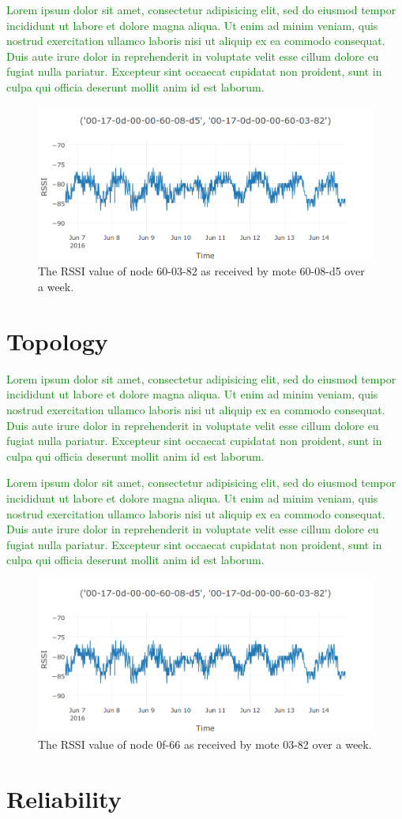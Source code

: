 \documentclass{sig-alternate}
\newcommand{\lorem}               {\textcolor{green}{Lorem ipsum dolor sit amet, consectetur adipisicing elit, sed do eiusmod tempor incididunt ut labore et dolore magna aliqua. Ut enim ad minim veniam, quis nostrud exercitation ullamco laboris nisi ut aliquip ex ea commodo consequat. Duis aute irure dolor in reprehenderit in voluptate velit esse cillum dolore eu fugiat nulla pariatur. Excepteur sint occaecat cupidatat non proident, sunt in culpa qui officia deserunt mollit anim id est laborum.}}
\begin{document}
\lorem


\begin{figure}
    \centering
    \includegraphics[width=\columnwidth]{periodic_rssi}
    \caption{The RSSI value of node 60-03-82 as received by mote 60-08-d5 over a week.}
    \label{fig:periodic_rssi}
\end{figure}


\section{Topology}
\label{sec:topology}


\lorem


\lorem

\begin{figure}
    \centering
    \includegraphics[width=\columnwidth]{periodic_rssi}
    \caption{The RSSI value of node 0f-66 as received by mote 03-82 over a week.}
    \label{fig:topology}
\end{figure}

\section{Reliability}
\label{sec:reliability}
\end{document}
